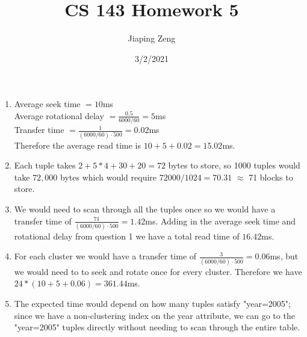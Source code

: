 \documentclass{article}
\title{CS 143 Homework 5}
\date{3/2/2021}
\author{Jiaping Zeng}
\begin{document}
\maketitle

\begin{enumerate}
    \item Average seek time $=10$ms\\Average rotational delay $=\frac{0.5}{6000/60}=5$ms\\Transfer time $=\frac{1}{(6000/60)\cdot 500}=0.02$ms\\Therefore the average read time is $10+5+0.02=15.02$ms.
    \item Each tuple takes $2+5*4+30+20=72$ bytes to store, so 1000 tuples would take $72,000$ bytes which would require $72000/1024=70.31$ $\approx$ 71 blocks to store.
    \item We would need to scan through all the tuples once so we would have a transfer time of $\frac{71}{(6000/60)\cdot 500}=1.42$ms. Adding in the average seek time and rotational delay from question 1 we have a total read time of $16.42$ms.
    \item For each cluster we would have a transfer time of $\frac{3}{(6000/60)\cdot 500}=0.06$ms, but we would need to to seek and rotate once for every cluster. Therefore we have $24*(10+5+0.06)=361.44$ms.
    \item The expected time would depend on how many tuples satisfy "year=2005"; since we have a non-clustering index on the year attribute, we can go to the "year=2005" tuples directly without needing to scan through the entire table.
\end{enumerate}
\end{document}
